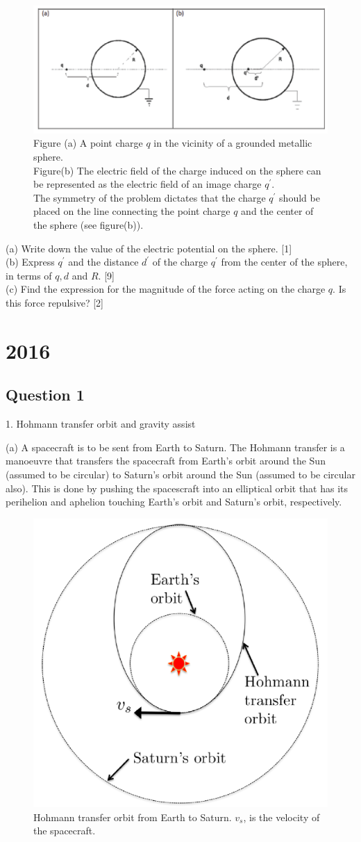 \documentclass{article}
\begin{document}
\begin{figure}
	\centering
	\includegraphics[width=0.5\linewidth]{spho_book_TYS_images/2015q11.png}
	\caption{
		Figure (a) A point charge $q$ in the vicinity of a grounded metallic sphere. \\
		Figure(b) The electric field of the charge induced on the sphere can be represented as the electric field of an image charge $q^{\prime}$. \\
		The symmetry of the problem dictates that the charge $q^{\prime}$ should be placed on the line connecting the point charge $q$ and the center of the sphere (see figure(b)).
	}
\end{figure}
(a) Write down the value of the electric potential on the sphere. [1] \\
(b) Express $q^{\prime}$ and the distance $d^{\prime}$ of the charge $q^{\prime}$ from the center of the sphere, in terms of $q, d$ and $R$. [9] \\
(c) Find the expression for the magnitude of the force acting on the charge $q$. Is this force repulsive? [2]

\section{2016}

\subsection{Question 1}
1. Hohmann transfer orbit and gravity assist

(a) A spacecraft is to be sent from Earth to Saturn. The Hohmann transfer is a manoeuvre that transfers the
spacecraft from Earth’s orbit around the Sun (assumed to be circular) to Saturn’s orbit around the Sun (assumed
to be circular also). This is done by pushing the spacescraft into an elliptical orbit that has its perihelion and
aphelion touching Earth’s orbit and Saturn’s orbit, respectively.

\begin{figure}
	\centering
	\includegraphics[width=0.5\linewidth]{spho_book_TYS_images/2016q1.png}
	\caption{Hohmann transfer orbit from Earth to Saturn. $v_s$, is the velocity of the spacecraft.}
\end{figure}
\end{document}
